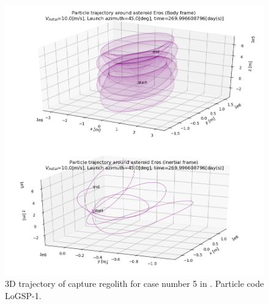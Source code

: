 \documentclass[print]{tudelft-report}
\begin{document}
\begin{appendices}
\begin{figure}[htb]
    \label{fig:trailingEdge_IC_for_24h_orbits}
    \end{figure}
    \FloatBarrier
    \begin{figure}[htb]
    \centering
    \captionsetup{justification=centering}
    \includegraphics[width=\textwidth, height=\textheight]{Results/Images/longest_edge_perturbations/3.2Density_1cmSize/3dTrajectory_10ms_45Azimuth_315solarPhase.png}
    \caption{3D trajectory of capture regolith for case number 5 in . Particle code LoGSP-1.}
    \label{fig:LoGSP_1_capture_case_5_3d_trajectory}
    \end{figure}
    \FloatBarrier
    \begin{figure}[htb]
    \centering
    \captionsetup{justification=centering}

\end{figure}
\end{appendices}
\end{document}
